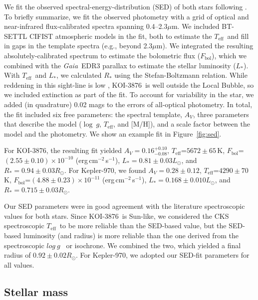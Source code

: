 \documentclass[twocolumn, linenumbers]{aastex631}
\newcommand{\starname}{KOI-3876}
\newcommand{\starnametwo}{Kepler-970}
\newcommand{\logg}{$log~g$ }
\newcommand{\um}{$\mu$m}
\newcommand{\fbol}{$F_{\mathrm{bol}}$}
\newcommand{\teff}{\ensuremath{T_{\text{eff}}}}
\newcommand{\gaia}{\textit{Gaia}}
\begin{document}
We fit the observed spectral-energy-distribution (SED) of both stars following \citet{Mann2016b}. To briefly summarize, we fit the observed photometry with a grid of optical and near-infrared flux-calibrated spectra spanning 0.4--2.3\um. We included BT-SETTL CIFIST atmospheric models \citep{BHAC15} in the fit, both to estimate the \teff\ and fill in gaps in the template spectra (e.g., beyond 2.3\um). We integrated the resulting absolutely-calibrated spectrum to estimate the bolometric flux (\fbol), which we combined with the \gaia\ EDR3 parallax to estimate the stellar luminosity ($L_*$). With \teff\ and $L_*$, we calculated $R_*$ using the Stefan-Boltzmann relation. While reddening in this sight-line is low \citep{2011ApJ...737..103S}, \starname\ is well outside the Local Bubble, so we included extinction as part of the fit. To account for variability in the star, we added (in quadrature) 0.02 mags to the errors of all-optical photometry. In total, the fit included six free parameters: the spectral template, $A_V$, three parameters that describe the model ($\log~g$, \teff, and [M/H]), and a scale factor between the model and the photometry. We show an example fit in Figure~\ref{fig:sed}. 

For \starname, the resulting fit yielded $A_V=0.16^{+0.10}_{-0.08}$, \teff=$5672\pm65$\,K, \fbol=$(2.55\pm0.10)\times10^{-10}$ (erg\,cm$^{-2}$\,s$^{-1}$), $L_*=0.81\pm0.03L_\odot$, and $R_*=0.94\pm0.03R_\odot$. For \starnametwo, we found $A_V=0.28\pm0.12$, \teff=$4290\pm70$\,K, \fbol=$(4.88\pm0.23)\times10^{-11}$ (erg\,cm$^{-2}$\,s$^{-1}$), $L_*=0.168\pm0.010L_\odot$, and $R_*=0.715\pm0.03R_\odot$.

Our SED parameters were in good agreement with the literature spectroscopic values for both stars. Since \starname\ is Sun-like, we considered the CKS spectroscopic \teff\ to be more reliable than the SED-based value, but the SED-based luminosity (and radius) is more reliable than the one derived from the spectroscopic \logg\ or isochrone. We combined the two, which yielded a final radius of $0.92\pm0.02R_\odot$. For \starnametwo, we adopted our SED-fit parameters for all values. 


\subsection{Stellar mass}\label{sec:mass}
\end{document}
